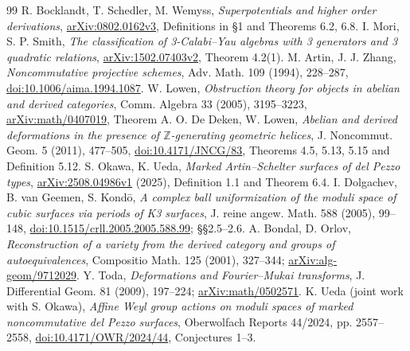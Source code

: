 \documentclass[11pt,a4paper]{ltjsarticle}
\theoremstyle{definition}\newtheorem{remark}[theorem]{注意}
\begin{document}
\begin{thebibliography}{99}
 R. Bocklandt, T. Schedler, M. Wemyss,
\emph{Superpotentials and higher order derivations},
\href{https://arxiv.org/abs/0802.0162}{arXiv:0802.0162v3}, Definitions in \S1 and Theorems 6.2, 6.8.
 I. Mori, S. P. Smith,
\emph{The classification of 3-Calabi--Yau algebras with 3 generators and 3 quadratic relations},
\href{https://arxiv.org/abs/1502.07403}{arXiv:1502.07403v2}, Theorem 4.2(1).
 M. Artin, J. J. Zhang,
\emph{Noncommutative projective schemes}, Adv. Math. 109 (1994), 228--287,
\href{https://doi.org/10.1006/aima.1994.1087}{doi:10.1006/aima.1994.1087}.
 W. Lowen,
\emph{Obstruction theory for objects in abelian and derived categories},
Comm. Algebra 33 (2005), 3195--3223,
\href{https://arxiv.org/abs/math/0407019}{arXiv:math/0407019}, Theorem A.
 O. De Deken, W. Lowen,
\emph{Abelian and derived deformations in the presence of $\mathbb Z$-generating geometric helices},
J. Noncommut. Geom. 5 (2011), 477--505,
\href{https://doi.org/10.4171/JNCG/83}{doi:10.4171/JNCG/83},
Theorems 4.5, 5.13, 5.15 and Definition 5.12.
 S. Okawa, K. Ueda,
\emph{Marked Artin--Schelter surfaces of del Pezzo types},
\href{https://arxiv.org/abs/2508.04986}{arXiv:2508.04986v1} (2025),
Definition 1.1 and Theorem 6.4.
 I. Dolgachev, B. van Geemen, S. Kond\=o,
\emph{A complex ball uniformization of the moduli space of cubic surfaces
via periods of K3 surfaces},
J. reine angew. Math. 588 (2005), 99--148,
\href{https://doi.org/10.1515/crll.2005.2005.588.99}{doi:10.1515/crll.2005.2005.588.99};
\S\S 2.5--2.6.
 A. Bondal, D. Orlov,
\emph{Reconstruction of a variety from the derived category and groups of autoequivalences},
Compositio Math. 125 (2001), 327--344;
\href{https://arxiv.org/abs/alg-geom/9712029}{arXiv:alg-geom/9712029}.
 Y. Toda, \emph{Deformations and Fourier--Mukai transforms},
J. Differential Geom. 81 (2009), 197--224;
\href{https://arxiv.org/abs/math/0502571}{arXiv:math/0502571}.
 K. Ueda (joint work with S. Okawa),
\emph{Affine Weyl group actions on moduli spaces of marked noncommutative del Pezzo surfaces},
Oberwolfach Reports 44/2024, pp. 2557--2558,
\href{https://doi.org/10.4171/OWR/2024/44}{doi:10.4171/OWR/2024/44}, Conjectures 1--3.

\end{thebibliography}
\end{document}
